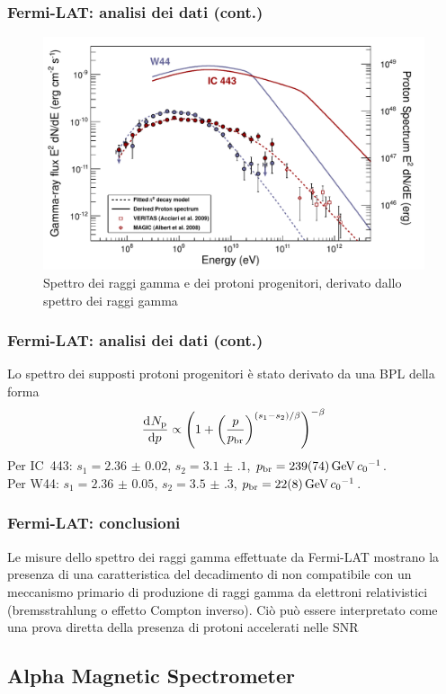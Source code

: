 \documentclass[10pt]{beamer}
\newcommand*{\dd}{\mathop{}\!\textup{d}} %
\newcommand*{\toder}[3][]{\frac{{\dd^{#1}}#2}{\dd {#3}^{#1}}}
\begin{document}
\begin{frame}
  \frametitle{Fermi-LAT: analisi dei dati (cont.)}
  \begin{figure}
    \centering
    \includegraphics[width=.8\columnwidth]{1231160fig3}
    \caption{Spettro dei raggi gamma e dei protoni progenitori, derivato dallo
      spettro dei raggi gamma}
  \end{figure}
\end{frame}

\begin{frame}
  \frametitle{Fermi-LAT: analisi dei dati (cont.)}
  Lo spettro dei supposti protoni progenitori è stato derivato da una BPL della
  forma
  \begin{equation*}
    \toder{N_{\textup{p}}}{p} \propto
    \left(
      1 +
      \left(
        \frac{p}{p_{\textup{br}}}
      \right)^{(s_{1} - s_{2})/\beta}
    \right)^{-\beta}
  \end{equation*}
  Per IC~443: $s_{1} = \num{2.36(2)}$, $s_{2} = \num{3.1(1)}$,
  $p_{\textup{br}} = \SI{239(74)}{\giga \electronvolt \per \clight}$.  \\
  Per W44: $s_{1} = \num{2.36(5)}$, $s_{2} = \num{3.5(3)}$,
  $p_{\textup{br}} = \SI{22(8)}{\giga \electronvolt \per \clight}$.
\end{frame}

\begin{frame}
  \frametitle{Fermi-LAT: conclusioni}
  Le misure dello spettro dei raggi gamma effettuate da Fermi-LAT mostrano la
  presenza di una \alert{caratteristica del decadimento di \PGpz} non
  compatibile con un meccanismo primario di produzione di raggi gamma da
  elettroni relativistici (bremsstrahlung o effetto Compton inverso).  Ciò può
  essere interpretato come una
  \alert{prova diretta della presenza di protoni accelerati} nelle SNR
\end{frame}

\subsection{Alpha Magnetic Spectrometer}
\end{document}
